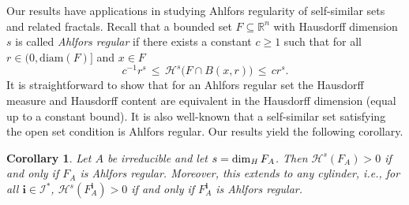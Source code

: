 \documentclass[11pt,english,british]{article}
\numberwithin{equation}{section}
\newtheorem{cor}[thm]{Corollary}
\renewcommand{\geq}{\geqslant}
\renewcommand{\leq}{\leqslant}
\begin{document}
Our results have applications in studying Ahlfors regularity of self-similar sets and related fractals.  Recall that a bounded set $F \subseteq \mathbb{R}^n$ with Hausdorff dimension $s$ is called \emph{Ahlfors regular} if there exists a constant $c \geq 1$ such that for all $r \in (0, \text{diam}(F) ]$ and $x \in F$
\[
c^{-1} r^s \, \leq \, \mathcal{H}^s\big( F \cap B(x,r) \big)  \, \leq \, c r^s.
\]
It is straightforward to show that for an Ahlfors regular set the Hausdorff measure and Hausdorff content are equivalent in the Hausdorff dimension (equal up to a constant bound).  It is also well-known that a self-similar set satisfying the open set condition is Ahlfors regular.  Our results yield the following corollary.

\begin{cor} \label{ahlforscor}
 Let $A$ be irreducible and let $s = \dim_\text{\emph{H}} F_A$.  Then $\mathcal{H}^s (F_A) >0 $ if and only if $F_A$ is Ahlfors regular.  Moreover, this extends to any cylinder, i.e., for all $\textbf{i} \in \mathcal{I}^*$, $\mathcal{H}^s (F_A^\textbf{i}) >0 $ if and only if $F_A^\textbf{i}$ is Ahlfors regular.
\end{cor}
\end{document}
